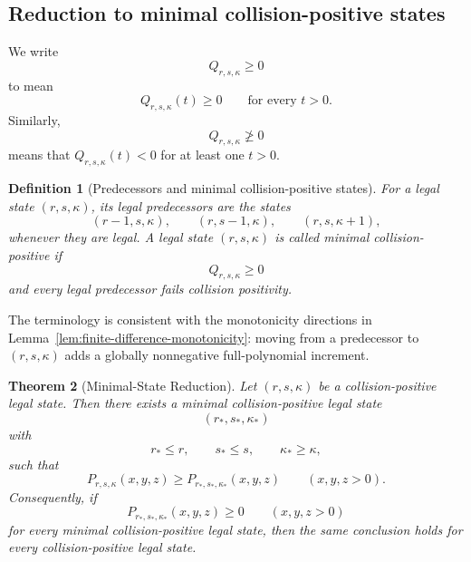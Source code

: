 \documentclass[10pt,a4paper]{amsart}
\newtheorem{theorem}{Theorem}[section]
\newtheorem{definition}[theorem]{Definition}
\begin{document}
\subsection{Reduction to minimal collision-positive states}

We write
\begin{equation*}
Q_{r,s,\kappa}\ge0
\end{equation*}
to mean
\begin{equation*}
Q_{r,s,\kappa}(t)\ge0
\qquad\text{for every }t>0.
\end{equation*}
Similarly,
\begin{equation*}
Q_{r,s,\kappa}\not\ge0
\end{equation*}
means that \(Q_{r,s,\kappa}(t)<0\) for at least one \(t>0\).

\begin{definition}[Predecessors and minimal collision-positive states]
\label{def:minimal-collision-positive}
For a legal state \((r,s,\kappa)\), its legal predecessors are the states
\begin{equation*}
(r-1,s,\kappa),
\qquad
(r,s-1,\kappa),
\qquad
(r,s,\kappa+1),
\end{equation*}
whenever they are legal.
A legal state \((r,s,\kappa)\) is called \emph{minimal collision-positive} if
\begin{equation*}
Q_{r,s,\kappa}\ge0
\end{equation*}
and every legal predecessor fails collision positivity.
\end{definition}

The terminology is consistent with the monotonicity directions in Lemma~\ref{lem:finite-difference-monotonicity}: moving from a predecessor to \((r,s,\kappa)\) adds a globally nonnegative full-polynomial increment.


\begin{theorem}[Minimal-State Reduction]
\label{thm:minimal-state-reduction}
Let \((r,s,\kappa)\) be a collision-positive legal state.  Then there exists a minimal collision-positive legal state
\begin{equation*}
(r_*,s_*,\kappa_*)
\end{equation*}
with
\begin{equation*}
r_*\le r,
\qquad
s_*\le s,
\qquad
\kappa_*\ge\kappa,
\end{equation*}
such that
\begin{equation*}
P_{r,s,\kappa}(x,y,z)
\ge
P_{r_*,s_*,\kappa_*}(x,y,z)
\qquad(x,y,z>0).
\end{equation*}
Consequently, if
\begin{equation*}
P_{r_*,s_*,\kappa_*}(x,y,z)\ge0
\qquad(x,y,z>0)
\end{equation*}
for every minimal collision-positive legal state, then the same conclusion holds for every collision-positive legal state.
\end{theorem}
\end{document}
